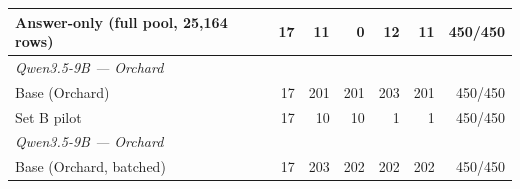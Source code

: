 \begin{table}[t]
{\begin{tabular}{lrrrrrr}
Answer-only (full pool, 25,164 rows) & 17 & 11 & 0 & 12 & 11 & 450/450 \\
\midrule
\multicolumn{7}{l}{\textit{Qwen3.5-9B --- Orchard}} \\
Base (Orchard) & 17 & 201 & 201 & 203 & 201 & 450/450 \\
Set B pilot & 17 & 10 & 10 & 1 & 1 & 450/450 \\
\midrule
\multicolumn{7}{l}{\textit{Qwen3.5-9B --- Orchard}} \\
Base (Orchard, batched) & 17 & 203 & 202 & 202 & 202 & 450/450 \\

\end{tabular}}
\end{table}
